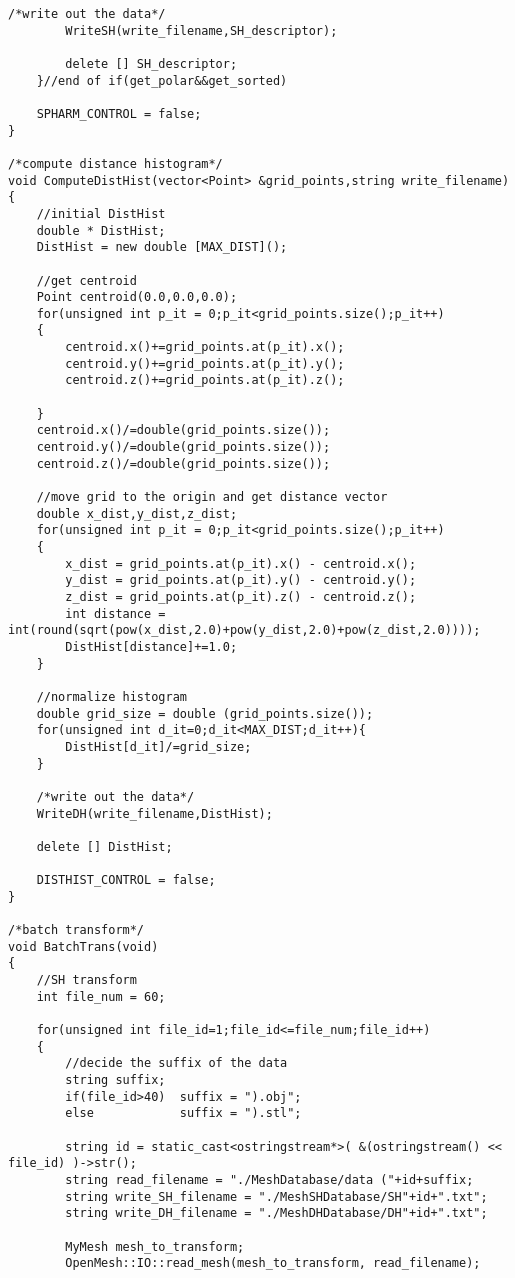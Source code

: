 \begin{enumerate}[1.]
\begin{lstlisting}[xleftmargin=0em]
		/*write out the data*/
		WriteSH(write_filename,SH_descriptor);

		delete [] SH_descriptor;
	}//end of if(get_polar&&get_sorted)

	SPHARM_CONTROL = false;
}

/*compute distance histogram*/
void ComputeDistHist(vector<Point> &grid_points,string write_filename)
{
	//initial DistHist
	double * DistHist;
	DistHist = new double [MAX_DIST]();

	//get centroid
	Point centroid(0.0,0.0,0.0);
	for(unsigned int p_it = 0;p_it<grid_points.size();p_it++)
	{
		centroid.x()+=grid_points.at(p_it).x();
		centroid.y()+=grid_points.at(p_it).y();
		centroid.z()+=grid_points.at(p_it).z();

	}
	centroid.x()/=double(grid_points.size());
	centroid.y()/=double(grid_points.size());
	centroid.z()/=double(grid_points.size());

	//move grid to the origin and get distance vector
	double x_dist,y_dist,z_dist;
	for(unsigned int p_it = 0;p_it<grid_points.size();p_it++)
	{
		x_dist = grid_points.at(p_it).x() - centroid.x();
		y_dist = grid_points.at(p_it).y() - centroid.y();
		z_dist = grid_points.at(p_it).z() - centroid.z();
		int distance = int(round(sqrt(pow(x_dist,2.0)+pow(y_dist,2.0)+pow(z_dist,2.0))));
		DistHist[distance]+=1.0;
	}

	//normalize histogram
	double grid_size = double (grid_points.size());
	for(unsigned int d_it=0;d_it<MAX_DIST;d_it++){
		DistHist[d_it]/=grid_size;
	}

	/*write out the data*/
	WriteDH(write_filename,DistHist);

	delete [] DistHist;

	DISTHIST_CONTROL = false;
}

/*batch transform*/
void BatchTrans(void)
{
	//SH transform
	int file_num = 60;

	for(unsigned int file_id=1;file_id<=file_num;file_id++)
	{
		//decide the suffix of the data
		string suffix;
		if(file_id>40)	suffix = ").obj";
		else			suffix = ").stl";

		string id = static_cast<ostringstream*>( &(ostringstream() << file_id) )->str();
		string read_filename = "./MeshDatabase/data ("+id+suffix;
		string write_SH_filename = "./MeshSHDatabase/SH"+id+".txt";
		string write_DH_filename = "./MeshDHDatabase/DH"+id+".txt";

		MyMesh mesh_to_transform;
		OpenMesh::IO::read_mesh(mesh_to_transform, read_filename);


\end{lstlisting}
\end{enumerate}
